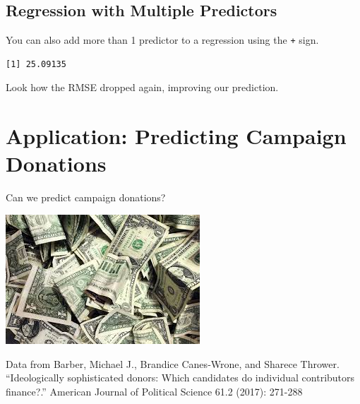 \documentclass[
  letterpaper,
  DIV=11,
  numbers=noendperiod]{scrreprt}
\newenvironment{Shaded}{\begin{snugshade}}{\end{snugshade}}
\newcommand{\AttributeTok}[1]{\textcolor[rgb]{0.40,0.45,0.13}{#1}}
\newcommand{\DecValTok}[1]{\textcolor[rgb]{0.68,0.00,0.00}{#1}}
\newcommand{\DocumentationTok}[1]{\textcolor[rgb]{0.37,0.37,0.37}{\textit{#1}}}
\newcommand{\FunctionTok}[1]{\textcolor[rgb]{0.28,0.35,0.67}{#1}}
\newcommand{\NormalTok}[1]{\textcolor[rgb]{0.00,0.23,0.31}{#1}}
\newcommand{\OtherTok}[1]{\textcolor[rgb]{0.00,0.23,0.31}{#1}}
\newcommand{\SpecialCharTok}[1]{\textcolor[rgb]{0.37,0.37,0.37}{#1}}
\begin{document}
\hypertarget{regression-with-multiple-predictors}{%
\subsection{Regression with Multiple
Predictors}\label{regression-with-multiple-predictors}}

You can also add more than 1 predictor to a regression using the
\texttt{+} sign.

\begin{Shaded}
\end{Shaded}

\begin{verbatim}
[1] 25.09135
\end{verbatim}

Look how the RMSE dropped again, improving our prediction.

\hypertarget{application-predicting-campaign-donations}{%
\section{Application: Predicting Campaign
Donations}\label{application-predicting-campaign-donations}}

Can we predict campaign donations?

\includegraphics{images/moneymoney.jpeg}

Data from Barber, Michael J., Brandice Canes‐Wrone, and Sharece Thrower.
``Ideologically sophisticated donors: Which candidates do individual
contributors finance?.'' American Journal of Political Science 61.2
(2017): 271-288
\end{document}
